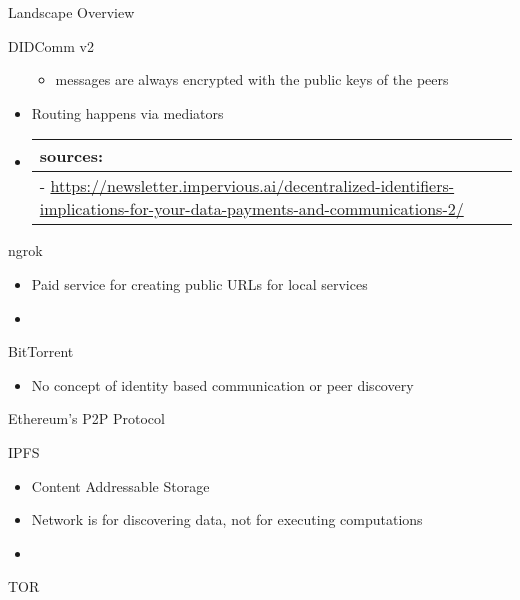\begin{frame}[fragile]{Landscape Overview}
\begin{block}{DIDComm v2}
\begin{itemize}
  \begin{itemize}
  \tightlist
  \item
    messages are always encrypted with the public keys of the peers
  \end{itemize}
\item
  Routing happens via mediators
\item
  \begin{longtable}[]{@{}l@{}}
  \toprule()
  sources: \\
  \midrule()
  \endhead
  -
  \url{https://newsletter.impervious.ai/decentralized-identifiers-implications-for-your-data-payments-and-communications-2/} \\
  \bottomrule()
  \end{longtable}
\end{itemize}
\end{block}

\begin{block}{ngrok}
\protect\hypertarget{ngrok}{}
\begin{itemize}
\tightlist
\item
  Paid service for creating public URLs for local services
\item
\end{itemize}
\end{block}

\begin{block}{BitTorrent}
\protect\hypertarget{bittorrent}{}
\begin{itemize}
\tightlist
\item
  No concept of identity based communication or peer discovery
\end{itemize}
\end{block}

\begin{block}{Ethereum's P2P Protocol}
\protect\hypertarget{ethereums-p2p-protocol}{}
\end{block}

\begin{block}{IPFS}
\protect\hypertarget{ipfs}{}
\begin{itemize}
\tightlist
\item
  Content Addressable Storage
\item
  Network is for discovering data, not for executing computations
\item
\end{itemize}
\end{block}

\begin{block}{TOR}
\protect\hypertarget{tor}{}
\end{block}


\end{frame}
